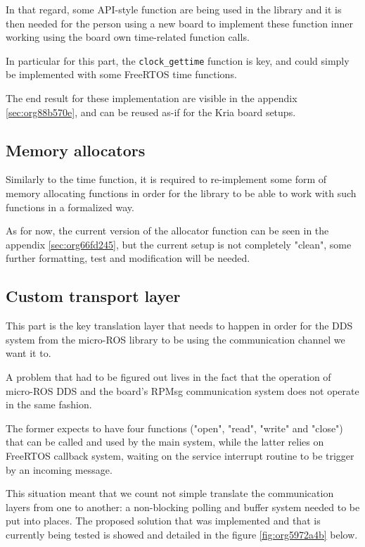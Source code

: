 \documentclass[10pt]{article}
\begin{document}
In that regard, some API-style function are being
used in the library and it is then needed for the person using a new board
to implement these function inner working using the board own time-related
function calls.

In particular for this part, the \texttt{clock\_gettime} function is key, and could
simply be implemented with some FreeRTOS time functions.

The end result for these implementation are visible in the appendix \ref{sec:org88b570e},
and can be reused as-if for the Kria board setups.

\subsection{Memory allocators}
\label{sec:org66ed2b0}
Similarly to the time function, it is required to re-implement some form of memory allocating
functions in order for the library to be able to work with such functions in a formalized way.

As for now, the current version of the allocator function can be seen in the
appendix \ref{sec:org66fd245}, but the current setup is not
completely "clean", some further formatting, test and modification will be needed.

\subsection{Custom transport layer}
\label{sec:orgdc3dfeb}
This part is the key translation layer that needs to happen in order for the
DDS system from the micro-ROS library to be using the communication channel we
want it to.

A problem that had to be figured out lives in the fact that the operation of micro-ROS DDS
and the board's RPMsg communication system does not operate in the same fashion.

The former expects to have four functions ("open", "read", "write" and "close") that can
be called and used by the main system, while the latter relies on FreeRTOS callback
system, waiting on the service interrupt routine to be trigger by an incoming message.

This situation meant that we count not simple translate the communication layers from one
to another: a non-blocking polling and buffer system needed to be put into places.
The proposed solution that was implemented and that is currently being tested
is showed and detailed in the figure \ref{fig:org5972a4b} below.
\end{document}
